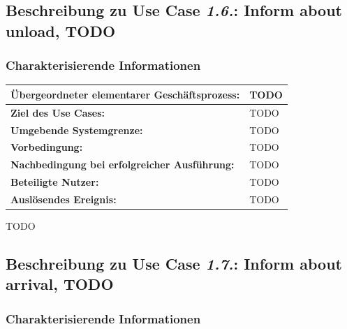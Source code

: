 	
		\pagebreak
		
			\subsection*{Beschreibung zu Use Case \emph{1.6.}: Inform about unload, TODO}
				\subsubsection*{Charakterisierende Informationen}
				
				\begin{table}[H]
					\centering
					\begin{tabularx}{\textwidth}{|p{5cm}|X|}
						\hline
						\textbf{Übergeordneter elementarer Geschäftsprozess:} & TODO  \\ \hline
						\textbf{Ziel des Use Cases:} & TODO \\ \hline
						\textbf{Umgebende Systemgrenze:} & TODO \\ \hline
						\textbf{Vorbedingung:} & TODO \\ \hline
						\textbf{Nachbedingung bei erfolgreicher Ausführung:} & TODO \\ \hline
						\textbf{Beteiligte Nutzer:} & TODO \\ \hline
						\textbf{Auslösendes Ereignis:} & TODO \\
						\hline
					\end{tabularx}
				\end{table}
				
				TODO
				
				
				\pagebreak
		
			\subsection*{Beschreibung zu Use Case \emph{1.7.}: Inform about arrival, TODO}
			
			
			
				
				\subsubsection*{Charakterisierende Informationen}
				
